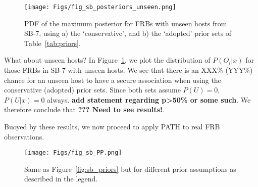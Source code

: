 \documentclass[twocolumn,linenumbers]{aastex63}
\newcommand{\mpoffset}{p(\omega|O_i)}  %
\newcommand{\poffset}{$\mpoffset$}
\newcommand{\mPO}{P(O)}  %
\newcommand{\PO}{$\mPO$}
\newcommand{\mPOix}{P(O_i|x)}  %
\begin{document}
\begin{figure}[!ht]
\centering
    \texttt{[image: Figs/fig\_sb\_posteriors\_unseen.png]}
    \caption{PDF of the maximum posterior for FRBs with unseen hosts from SB-7,
    using a) the `conservative', and b) the `adopted' prior sets of Table~\ref{tab:priors}.
    }
	\label{fig:sb_post_unseen}
\end{figure}

What about unseen hosts? In Figure~\ref{fig:sb_post_unseen}, we plot the distribution of $\mPOix$ for those FRBs in SB-7 with unseen hosts. We see that there is an XXX\% (YYY\%) chance for an unseen host to have a secure association when using the conservative (adopted) prior sets. Since both sets assume $P(U)=0$, $P(U|x)=0$ always. {\bf add statement regarding p>50\% or some such}. We therefore conclude that {\bf ??? Need to see results!}.


Buoyed by these results, we now proceed to apply PATH
to real FRB observations.




%
%

\begin{figure}[!ht]
\centering
    \texttt{[image: Figs/fig\_sb\_PP.png]}
    \caption{
    Same as Figure~\ref{fig:sb_priors}
    but for different prior assumptions as described
    in the legend.
    }
	\label{fig:sb_punchline}
\end{figure}
\end{document}
